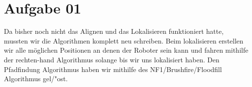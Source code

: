 \newpage
\section{Aufgabe 01}
Da bisher noch nicht das Alignen und das Lokalisieren funktioniert hatte, mussten wir die Algorithmen komplett neu schreiben.
Beim lokalisieren erstellen wir alle m\"oglichen Positionen an denen der Roboter sein kann und fahren mithilfe der rechten-hand Algorithmus solange bis wir uns lokalisiert haben.
Den Pfadfindung Algorithmus haben wir mithilfe des NF1/Brushfire/Floodfill Algorithmus gel/"ost.

